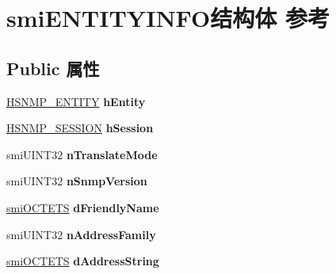 \hypertarget{structsmi_e_n_t_i_t_y_i_n_f_o}{}\section{smi\+E\+N\+T\+I\+T\+Y\+I\+N\+F\+O结构体 参考}
\label{structsmi_e_n_t_i_t_y_i_n_f_o}
\subsection*{Public 属性}
\begin{DoxyCompactItemize}
\item 
\mbox{\label{structsmi_e_n_t_i_t_y_i_n_f_o_ac005f740e13624d221682dd325d9e1b8}} 
\hyperlink{interfacevoid}{H\+S\+N\+M\+P\+\_\+\+E\+N\+T\+I\+TY} {\bfseries h\+Entity}
\item 
\mbox{\label{structsmi_e_n_t_i_t_y_i_n_f_o_a424d3abf31858a62f1f9f9ccf440449c}} 
\hyperlink{interfacevoid}{H\+S\+N\+M\+P\+\_\+\+S\+E\+S\+S\+I\+ON} {\bfseries h\+Session}
\item 
\mbox{\label{structsmi_e_n_t_i_t_y_i_n_f_o_af2d5951e97d1875d564de09bb8952d26}} 
smi\+U\+I\+N\+T32 {\bfseries n\+Translate\+Mode}
\item 
\mbox{\label{structsmi_e_n_t_i_t_y_i_n_f_o_a182ec277dbb92745ce80fcfd601c4bd7}} 
smi\+U\+I\+N\+T32 {\bfseries n\+Snmp\+Version}
\item 
\mbox{\label{structsmi_e_n_t_i_t_y_i_n_f_o_ac4dc4f9f601e70121ced54919b21ea4c}} 
\hyperlink{structsmi_o_c_t_e_t_s}{smi\+O\+C\+T\+E\+TS} {\bfseries d\+Friendly\+Name}
\item 
\mbox{\label{structsmi_e_n_t_i_t_y_i_n_f_o_a7d3b93e42a4854ae8570c44a46415f2e}} 
smi\+U\+I\+N\+T32 {\bfseries n\+Address\+Family}
\item 
\mbox{\label{structsmi_e_n_t_i_t_y_i_n_f_o_a9fdc4268ca64db236415fb80fd5db4b3}} 
\hyperlink{structsmi_o_c_t_e_t_s}{smi\+O\+C\+T\+E\+TS} {\bfseries d\+Address\+String}
\item 
\mbox{\label{structsmi_e_n_t_i_t_y_i_n_f_o_a964a3329501716e0780ae07c12e33cbf}} 

\end{DoxyCompactItemize}
